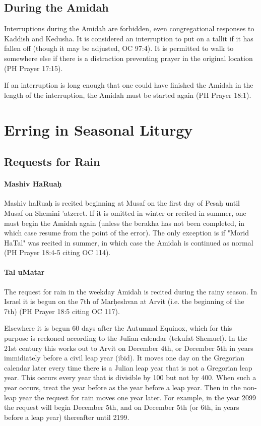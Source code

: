 \documentclass[11pt]{article}
\begin{document}
\subsection{During the Amidah}

Interruptions during the Amidah are forbidden, even congregational responses to Kaddish and Kedusha. It is considered an interruption to put on a tallit if it has fallen off (though it may be adjusted, OC 97:4).  It is permitted to walk to somewhere else if there is a distraction preventing prayer in the original location (PH Prayer 17:15).

If an interruption is long enough that one could have finished the Amidah in the length of the interruption, the Amidah must be started again (PH Prayer 18:1).

\section{Erring in Seasonal Liturgy}

\subsection{Requests for Rain}

\paragraph{Mashiv HaRua\d{h}}

Mashiv haRua\d{h} is recited beginning at Musaf on the first day of Pesa\d{h} until Musaf on Shemini 'atzeret.  If it is omitted in winter or recited in summer, one must begin the Amidah again (unless the berakha has not been completed, in which case resume from the point of the error).  The only exception is if "Morid HaTal" was recited in summer, in which case the Amidah is continued as normal (PH Prayer 18:4-5 citing OC 114).

\paragraph{Tal uMatar}

The request for rain in the weekday Amidah is recited during the rainy season.  In Israel it is begun on the 7th of Mar\d{h}eshvan at Arvit (i.e. the beginning of the 7th) (PH Prayer 18:5 citing OC 117).

Elsewhere it is begun 60 days after the Autumnal Equinox, which for this purpose is reckoned according to the Julian calendar (tekufat Shemuel).  In the 21st century this works out to Arvit on December 4th, or December 5th in years immidiately before a civil leap year (ibid).  It moves one day on the Gregorian calendar later every time there is a Julian leap year that is not a Gregorian leap year.  This occurs every year that is divisible by 100 but not by 400. When such a year occurs, treat the year before as the year before a leap year.  Then in the non-leap year the request for rain moves one year later.  For example, in the year 2099 the request will begin December 5th, and on December 5th (or 6th, in years before a leap year) thereafter until 2199.
\end{document}
